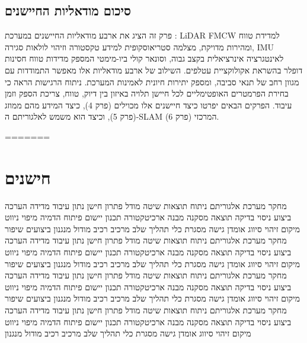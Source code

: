\subsection{סיכום מודאליות החיישנים}
\label{sec:ch03_summary}

פרק זה הציג את ארבע מודאליות החיישנים במערכת : LiDAR FMCW למדידת טווח ומהירות מדויקת, מצלמה סטריאוסקופית למידע טקסטורה וזיהוי לולאות סגירה, IMU לאינטגרציה אינרציאלית בקצב גבוה, וסונאר קולי ביו-מימטי המספק מדידות טווח חסינות דופלר בהשראת אקולוקציית עטלפים. השילוב של ארבע מודאליות אלו מאפשר התמודדות עם מגוון רחב של תנאי סביבה, ומספק יתירות חיונית לאמינות המערכת. ניתוח הרגישות הראה כי בחירת הפרמטרים האופטימליים לכל חיישן תלויה באיזון בין דיוק, טווח, צריכת הספק וזמן עיבוד. הפרקים הבאים יפרטו כיצד חיישנים אלו מכוילים (פרק 4), כיצד המידע מהם ממוזג (פרק 5), וכיצד הוא משמש לאלגוריתם ה-SLAM המרכזי (פרק 6).

\cite{Campos2021ORBSLAM3, Forster2017IMUPreint, Furgale2013Kalibr, GriffinBatEcholocation, MossEcholocation}
=======
\section{חישנים}
\label{sec:ch03}

מחקר מערכת אלגוריתם ניתוח תוצאות שיטה מודל פתרון חישן נתון עיבוד מדידה הערכה ביצוע ניסוי בדיקה תוצאה מסקנה מבנה ארכיטקטורה תכנון יישום פיתוח הדמיה מיפוי ניווט מיקום זיהוי סיווג אומדן גישה מסגרת כלי תהליך שלב מרכיב רכיב מודול מנגנון ביצועים שיפור מחקר מערכת אלגוריתם ניתוח תוצאות שיטה מודל פתרון חישן נתון עיבוד מדידה הערכה ביצוע ניסוי בדיקה תוצאה מסקנה מבנה ארכיטקטורה תכנון יישום פיתוח הדמיה מיפוי ניווט מיקום זיהוי סיווג אומדן גישה מסגרת כלי תהליך שלב מרכיב רכיב מודול מנגנון ביצועים שיפור מחקר מערכת אלגוריתם ניתוח תוצאות שיטה מודל פתרון חישן נתון עיבוד מדידה הערכה ביצוע ניסוי בדיקה תוצאה מסקנה מבנה ארכיטקטורה תכנון יישום פיתוח הדמיה מיפוי ניווט מיקום זיהוי סיווג אומדן גישה מסגרת כלי תהליך שלב מרכיב רכיב מודול מנגנון ביצועים שיפור מחקר מערכת אלגוריתם ניתוח תוצאות שיטה מודל פתרון חישן נתון עיבוד מדידה הערכה ביצוע ניסוי בדיקה תוצאה מסקנה מבנה ארכיטקטורה תכנון יישום פיתוח הדמיה מיפוי ניווט מיקום זיהוי סיווג אומדן גישה מסגרת כלי תהליך שלב מרכיב רכיב מודול מנגנון

